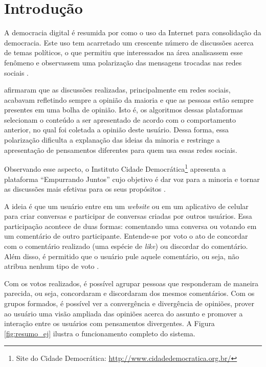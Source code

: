 \chapter[Introdução]{Introdução} \label{cap:introducao}

A democracia digital é resumida por  como o uso da Internet para consolidação da democracia.
Este uso tem acarretado um crescente número de discussões acerca de temas políticos, o que permitiu que interessados na área analisassem esse fenômeno e observassem uma 
polarização das mensagens trocadas nas redes sociais \cite{empurrandojuntos}.

 afirmaram que as discussões realizadas, principalmente em redes sociais, 
acabavam refletindo sempre a opinião da maioria e que as pessoas estão sempre presentes em uma bolha de opinião. 
Isto é, os algoritmos dessas plataformas selecionam o conteúdo a ser apresentado de acordo com o comportamento anterior,
no qual foi coletada a opinião deste usuário.
Dessa forma, essa polarização dificulta a explanação das ideias da minoria e restringe a apresentação de pensamentos diferentes para quem usa essas redes sociais. 

Observando esse aspecto, o Instituto Cidade Democrática\footnote{Site do Cidade Democrática: \url{http://www.cidadedemocratica.org.br/}} 
apresenta a plataforma ``Empurrando Juntos'' cujo objetivo 
é dar voz para a minoria e tornar as discussões mais efetivas para os seus propósitos \cite{empurrandojuntos}.

A ideia é que um usuário entre em um \textit{website} ou em um aplicativo de celular para criar conversas e 
participar de conversas criadas por outros usuários. Essa participação 
acontece de duas formas: comentando uma conversa ou votando em um comentário de outro participante. Entende-se por voto
o ato de concordar com o comentário realizado (uma espécie de \textit{like}) ou discordar do comentário. Além disso, é permitido
que o usuário pule aquele comentário, ou seja, não atribua nenhum tipo de voto \cite{empurrandojuntos}. 

Com os votos realizados, é possível agrupar pessoas que responderam de maneira parecida, ou seja, concordaram e
discordaram dos mesmos comentários. Com os grupos formados, é possível ver a convergência e divergência de opiniões, 
prover ao usuário uma visão ampliada das opiniões acerca do assunto e promover a interação entre os usuários com 
pensamentos divergentes. A Figura \ref{fig:resumo_ej} ilustra o funcionamento completo do sistema.


